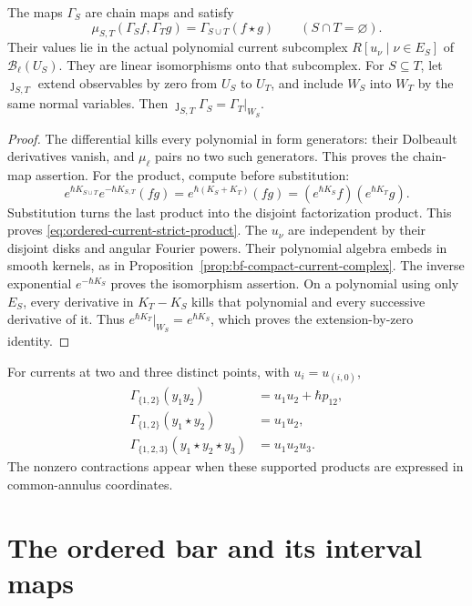\begin{theorem}
\label{thm:ordered-current-wick-lift}
The maps $\Gamma_S$ are chain maps and satisfy
\begin{equation}
\label{eq:ordered-current-strict-product}
 \mu_{S,T}(\Gamma_Sf,\Gamma_Tg)=\Gamma_{S\cup T}(f\star g)
 \qquad(S\cap T=\varnothing).
\end{equation}
Their values lie in the actual polynomial current subcomplex
$R[u_\nu\mid\nu\in E_S]$ of $\mathcal B_\ell(U_S)$.
They are linear isomorphisms onto that subcomplex.
For $S\subseteq T$, let $\jmath_{S,T}$ extend observables by zero
from $U_S$ to $U_T$, and include $W_S$ into $W_T$ by the same
normal variables.  Then $\jmath_{S,T}\Gamma_S=\Gamma_T|_{W_S}$.
\end{theorem}
\begin{proof}
The differential kills every polynomial in form generators: their
Dolbeault derivatives vanish, and $\mu_\ell$ pairs no two such generators.
This proves the chain-map assertion.
For the product, compute before substitution:
\[
 e^{\hbar K_{S\cup T}}e^{-\hbar K_{S,T}}(fg)
 =e^{\hbar(K_S+K_T)}(fg)
 =(e^{\hbar K_S}f)(e^{\hbar K_T}g).
\]
Substitution turns the last product into the disjoint factorization
product.  This proves \eqref{eq:ordered-current-strict-product}.
The $u_\nu$ are independent by their disjoint disks and angular
Fourier powers.  Their polynomial algebra embeds in smooth kernels,
as in Proposition~\ref{prop:bf-compact-current-complex}.
The inverse exponential $e^{-\hbar K_S}$ proves the isomorphism assertion.
On a polynomial using only $E_S$, every derivative in $K_T-K_S$
kills that polynomial and every successive derivative of it.
Thus $e^{\hbar K_T}|_{W_S}=e^{\hbar K_S}$, which proves the
extension-by-zero identity.
\end{proof}

For currents at two and three distinct points, with $u_i=u_{(i,0)}$,
\[
 \begin{aligned}
 \Gamma_{\{1,2\}}(y_1y_2)&=u_1u_2+\hbar p_{12},\\
 \Gamma_{\{1,2\}}(y_1\star y_2)&=u_1u_2,\\
 \Gamma_{\{1,2,3\}}(y_1\star y_2\star y_3)&=u_1u_2u_3.
 \end{aligned}
\]
The nonzero contractions appear when these supported products are
expressed in common-annulus coordinates.

\section{The ordered bar and its interval maps}

